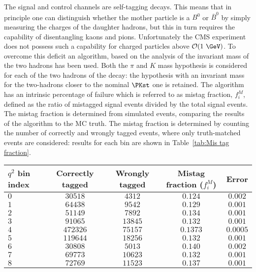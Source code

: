 The signal and control channels are self-tagging decays.
This means that in principle one can distinguish whether the mother particle is a $B^0$ or $\overline{B}^0$ by simply measuring the charges of the daughter hadrons, but this in turn requires the capability of disentangling kaons and pions.
Unfortunately the CMS experiment does not possess such a capability for charged particles above $\mathcal{O}(1~\GeV)$.
To overcome this deficit an algorithm, based on the analysis of the invariant mass of the two hadrons has been used.
Both the $\pi$ and $K$ mass hypothesis is considered for each of the two hadrons of the decay: the hypothesis with an invariant mass for the two-hadrons closer to the nominal $\PKst$ one is retained.
The algorithm has an intrinsic percentage of failure which is referred to as mistag fraction, $f^M_i$, defined as the ratio of mistagged signal events divided by the total signal events.
The mistag fraction is determined from simulated events, comparing the results of the algorithm to the MC truth.
The mistag fraction is determined by counting the number of correctly and wrongly tagged events, where only truth-matched events are considered: results for each bin are shown in Table~\ref{tab:Mis tag fraction}.

\begin{table*}[!htb]
    \begin{center}
        \begin{small}
            \caption{Number of correctly and wrongly CP-tagged events determined with signal and con-
                trol channel simulation samples for each $q^2$ bin in Table~\ref{tab:q2 bins}.
                \label{tab:Mis tag fraction}}
            \begin{tabular}{|l|c|c|c|c|}
                \hline
                $q^2$ bin index  & Correctly tagged &  Wrongly tagged   & Mistag fraction ($f^M_i$)  &   Error  \\
                \hline
                $ 0$    &  $ 30518 $      &  $ 4312 $  & $ 0.124 $ & $ 0.002 $    \\
                $ 1 $   &  $ 64438$       &  $9542$    & $ 0.129 $ & $ 0.001 $\\
                $ 2$    &  $ 51149 $      &  $7892$    & $ 0.134 $ & $ 0.001 $ \\
                $3 $    &  $ 91065$       &  $13845$   & $ 0.132 $ & $ 0.001 $   \\
                $4  $   &   $ 472326$     &  $75157$   & $0.1373 $ & $ 0.0005$ \\
                $ 5 $   &  $119644 $      &  $18256$   & $0.132  $ & $ 0.001 $\\
                $ 6$    &  $30808$        &  $5013 $   & $0.140 $  & $ 0.002$\\
                $ 7 $   &  $69773$        &  $10623$   & $0.132 $  & $ 0.001$\\
                $ 8 $   &  $72769$        &  $11523$   & $0.137$   & $0.001$\\
                \hline
            \end{tabular}
        \end{small}
    \end{center}
\end{table*}


